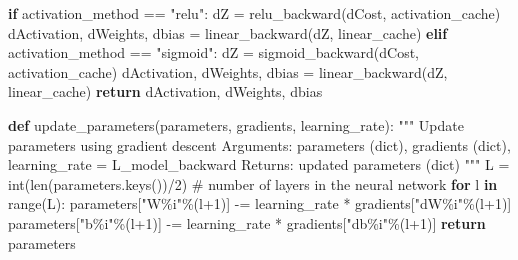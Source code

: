 \documentclass[
  letterpaper,
  DIV=11,
  numbers=noendperiod]{scrartcl}
\newenvironment{Shaded}{\begin{snugshade}}{\end{snugshade}}
\newcommand{\BuiltInTok}[1]{\textcolor[rgb]{0.00,0.23,0.31}{#1}}
\newcommand{\CommentTok}[1]{\textcolor[rgb]{0.37,0.37,0.37}{#1}}
\newcommand{\ControlFlowTok}[1]{\textcolor[rgb]{0.00,0.23,0.31}{\textbf{#1}}}
\newcommand{\DecValTok}[1]{\textcolor[rgb]{0.68,0.00,0.00}{#1}}
\newcommand{\KeywordTok}[1]{\textcolor[rgb]{0.00,0.23,0.31}{\textbf{#1}}}
\newcommand{\NormalTok}[1]{\textcolor[rgb]{0.00,0.23,0.31}{#1}}
\newcommand{\OperatorTok}[1]{\textcolor[rgb]{0.37,0.37,0.37}{#1}}
\newcommand{\SpecialCharTok}[1]{\textcolor[rgb]{0.37,0.37,0.37}{#1}}
\newcommand{\StringTok}[1]{\textcolor[rgb]{0.13,0.47,0.30}{#1}}
\begin{document}
\begin{Shaded}
\begin{Highlighting}[]
    \ControlFlowTok{if}\NormalTok{ activation\_method }\OperatorTok{==} \StringTok{"relu"}\NormalTok{:}
\NormalTok{        dZ }\OperatorTok{=}\NormalTok{ relu\_backward(dCost, activation\_cache)}
\NormalTok{        dActivation, dWeights, dbias }\OperatorTok{=}\NormalTok{ linear\_backward(dZ, linear\_cache)}
    \ControlFlowTok{elif}\NormalTok{ activation\_method }\OperatorTok{==} \StringTok{"sigmoid"}\NormalTok{:}
\NormalTok{        dZ }\OperatorTok{=}\NormalTok{ sigmoid\_backward(dCost, activation\_cache)}
\NormalTok{        dActivation, dWeights, dbias }\OperatorTok{=}\NormalTok{ linear\_backward(dZ, linear\_cache)}
    \ControlFlowTok{return}\NormalTok{ dActivation, dWeights, dbias}
\end{Highlighting}
\end{Shaded}

\begin{Shaded}
\begin{Highlighting}[]
\KeywordTok{def}\NormalTok{ update\_parameters(parameters, gradients, learning\_rate):}
    \CommentTok{""" Update parameters using gradient descent}
\CommentTok{    Arguments: parameters (dict), gradients (dict), learning\_rate = L\_model\_backward}
\CommentTok{    Returns:}
\CommentTok{    updated parameters (dict)}
\CommentTok{    """}
\NormalTok{    L }\OperatorTok{=} \BuiltInTok{int}\NormalTok{(}\BuiltInTok{len}\NormalTok{(parameters.keys())}\OperatorTok{/}\DecValTok{2}\NormalTok{) }\CommentTok{\# number of layers in the neural network}
    \ControlFlowTok{for}\NormalTok{ l }\KeywordTok{in} \BuiltInTok{range}\NormalTok{(L):}
\NormalTok{        parameters[}\StringTok{"W}\SpecialCharTok{\%i}\StringTok{"}\OperatorTok{\%}\NormalTok{(l}\OperatorTok{+}\DecValTok{1}\NormalTok{)] }\OperatorTok{{-}=}\NormalTok{ learning\_rate }\OperatorTok{*}\NormalTok{ gradients[}\StringTok{"dW}\SpecialCharTok{\%i}\StringTok{"}\OperatorTok{\%}\NormalTok{(l}\OperatorTok{+}\DecValTok{1}\NormalTok{)]}
\NormalTok{        parameters[}\StringTok{"b}\SpecialCharTok{\%i}\StringTok{"}\OperatorTok{\%}\NormalTok{(l}\OperatorTok{+}\DecValTok{1}\NormalTok{)] }\OperatorTok{{-}=}\NormalTok{ learning\_rate }\OperatorTok{*}\NormalTok{ gradients[}\StringTok{"db}\SpecialCharTok{\%i}\StringTok{"}\OperatorTok{\%}\NormalTok{(l}\OperatorTok{+}\DecValTok{1}\NormalTok{)]  }
    \ControlFlowTok{return}\NormalTok{ parameters}
\end{Highlighting}
\end{Shaded}
\end{document}
